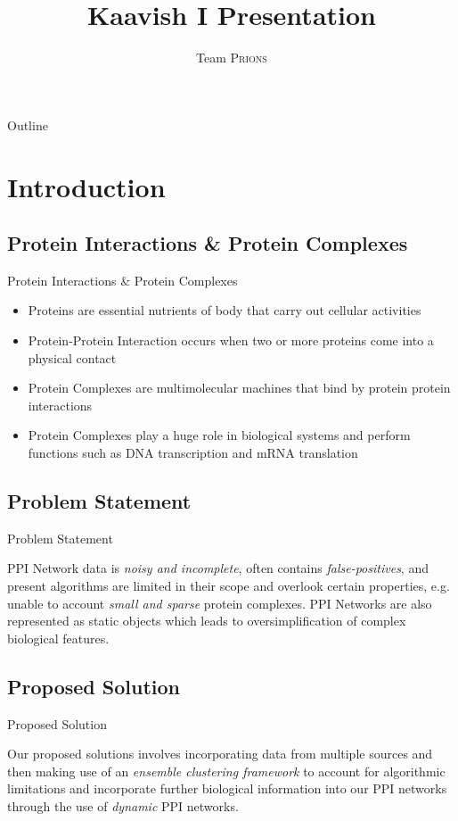 \documentclass[aspectratio=169]{beamer}
\title{Kaavish \textsc{I} Presentation}
\author{Team \textsc{Prions}}
\begin{document}

\begin{frame}[plain]

\end{frame}

\begin{frame}{Outline}
\tableofcontents
\end{frame}

\section{Introduction}

\subsection{Protein Interactions \& Protein Complexes}
\begin{frame}{Protein Interactions \& Protein Complexes}
    \begin{itemize}
        \item Proteins are essential nutrients of body that carry out cellular activities
        \item Protein-Protein Interaction occurs when two or more proteins come into a physical contact
        \item Protein Complexes are multimolecular machines that bind by protein protein interactions
        \item Protein Complexes play a huge role in biological systems and perform functions such as DNA transcription and mRNA translation
    \end{itemize}
\end{frame}

\subsection{Problem Statement}
\begin{frame}{Problem Statement}
\begin{tcolorbox}
    PPI Network data is \textit{noisy and incomplete}, often contains \textit{false-positives}, and present algorithms are limited in their scope and overlook certain properties, e.g. unable to account \textit{small and sparse} protein complexes. PPI Networks are also represented as static objects which leads to oversimplification of complex biological features.
\end{tcolorbox}
\end{frame}

\subsection{Proposed Solution}
\begin{frame}{Proposed Solution}
\begin{tcolorbox}
    Our proposed solutions involves incorporating data from multiple sources and then making use of an \textit{ensemble clustering framework} to account for algorithmic limitations and incorporate further biological information into our PPI networks through the use of \textit{dynamic} PPI networks.
\end{tcolorbox}
\end{frame}
\end{document}
